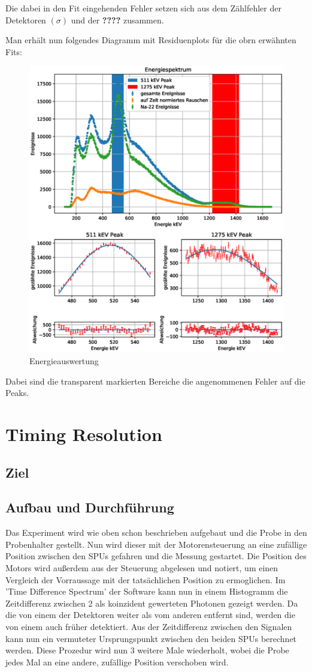 \documentclass[12pt,twoside,a4paper]{scrartcl}
\begin{document}
		Die dabei in den Fit eingehenden Fehler setzen sich aus dem Zählfehler der Detektoren $(\sigma)$ und  der \textbf{????} zusammen.

		Man erhält nun folgendes Diagramm mit Residuenplots für die obrn erwähnten Fits:

		\begin{figure}[H]
			\centering
			\includegraphics[width = 0.7 \textwidth]{Plots/energy_resultion.eps}
			\caption{Energieauswertung}
		\end{figure}

		Dabei sind die transparent markierten Bereiche die angenommenen Fehler auf die Peaks.

	\newpage

	\section{Timing Resolution}

		\subsection{Ziel}

		\subsection{Aufbau und Durchführung}
			Das Experiment wird wie oben schon beschrieben aufgebaut und die Probe in den Probenhalter gestellt. Nun wird dieser mit der Motorensteuerung an eine zufällige Position zwischen den SPUs gefahren und die Messung gestartet. Die Position des Motors wird außerdem aus der Steuerung abgelesen und notiert, um einen Vergleich der Vorraussage mit der tatsächlichen Position zu ermoglichen. Im 'Time Difference Spectrum' der Software kann nun in einem Histogramm die Zeitdifferenz zwischen 2 als koinzident gewerteten Photonen gezeigt werden. Da die von einem der Detektoren weiter als vom anderen entfernt sind, werden die von einem auch früher detektiert. Aus der Zeitdifferenz zwischen den Signalen kann nun ein vermuteter Ursprungspunkt zwischen den beiden SPUs berechnet werden. Diese Prozedur wird nun 3 weitere Male wiederholt, wobei die Probe jedes Mal an eine andere, zufällige Position verschoben wird.
\end{document}
